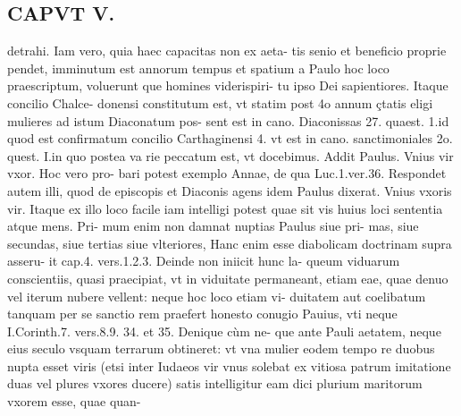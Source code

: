 \documentclass{article}
\begin{document}
\begin{pages}
\section*{CAPVT  V. } detrahi. Iam vero, quia haec capacitas non ex aeta- tis senio et beneficio proprie pendet, imminutum est annorum tempus et spatium a Paulo hoc loco praescriptum, voluerunt que homines viderispiri- tu ipso Dei sapientiores. Itaque concilio Chalce- donensi constitutum est, vt statim post 4o annum çtatis eligi mulieres ad istum Diaconatum pos- sent est in cano. Diaconissas 27. quaest. 1.id quod est confirmatum concilio Carthaginensi 4. vt est in cano. sanctimoniales 2o. quest. I.in quo postea va rie peccatum est, vt docebimus.  \pend\pstart Addit Paulus. Vnius vir vxor. Hoc vero pro- bari potest exemplo Annae, de qua Luc.1.ver.36. Respondet autem illi, quod de episcopis et Diaconis agens idem Paulus dixerat. Vnius vxoris vir. Itaque ex illo loco facile iam intelligi potest quae sit vis huius loci sententia atque mens. Pri- mum enim non damnat nuptias Paulus siue pri- mas, siue secundas, siue tertias siue vlteriores, Hanc enim esse diabolicam doctrinam supra asseru- it cap.4. vers.1.2.3. Deinde non iniicit hunc la- queum viduarum conscientiis, quasi praecipiat, vt in viduitate permaneant, etiam eae, quae denuo vel iterum nubere vellent: neque hoc loco etiam vi- duitatem aut coelibatum tanquam per se sanctio rem praefert honesto conugio Pauius, vti neque I.Corinth.7. vers.8.9. 34. et 35. Denique cùm ne- que ante Pauli aetatem, neque eius seculo vsquam terrarum obtineret: vt vna mulier eodem tempo re duobus nupta esset viris (etsi inter Iudaeos vir vnus solebat ex vitiosa patrum imitatione duas vel plures vxores ducere) satis intelligitur eam dici plurium maritorum vxorem esse, quae quan-  \pend

\end{pages}
\end{document}
